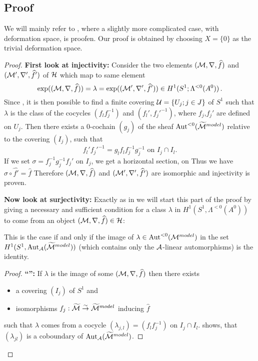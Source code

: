 \subsection{Proof}
We will mainly refer to \cite[section 6.d]{sabbah2007isomonodromic}, where a
slightly more complicated case, with deformation space, is proofen. Our proof is
obtained by choosing $X=\{0\}$ as the trivial deformation space.
\begin{comment}
  See also \cite{BJL1979Birkhoff} and \cite{babbitt1989local} although the proof
  goes back to work from Malgrange and Sibuya (see for example
  \cite{sibuya1990Linear}).
\end{comment}
\begin{proof}
  \textbf{First look at injectivity:}
  Consider the two elements $(\mathcal{M},\nabla,\widehat f)$ and $(\mathcal{M}',\nabla',\widehat f')$
  of $\mathcal{H}$ which map to same element
  \[
    \exp((\mathcal{M},\nabla,\widehat f))=\lambda=\exp((\mathcal{M}',\nabla',\widehat f'))
      \in H^1(S^1;\Lambda^{<0}(A^0)) \,.
  \]
  Since \TODO{}, it is then possible to find a finite covering
  $\mathcal{U}=\{U_j;j\in J\}$ of $S^1$ such that $\lambda$ is the class of the
  cocycles $(f_lf_j^{-1})$ and $(f_l',f_j'^{-1})$, where $f_j$,$f_j'$ are
  defined on $U_j$.
  Then there exists \TODO{} a $0$-cochain $(g_j)$ of the sheaf
  $\operatorname{Aut}^{<0}(\widetilde{\mathcal{M}}^{model})$ relative to the covering $(I_j)$, such that
  \[
    f_l'f_j'^{-1}=g_lf_lf_j^{-1}g_j^{-1} \text{ on } I_j\cap I_l.
  \]
  If we set $\sigma=f_j^{-1}g_{j}^{-1}f_j'$ on $I_{j}$, we get a horizontal
  section, on \TODO{}
  Thus we have $\sigma\circ\hat{f'}=\hat f$ Therefore $(\mathcal{M},\nabla,\widehat f)$ and
  $(\mathcal{M}',\nabla',\widehat{f'})$ are isomorphic and injectivity is proven.

  \textbf{Now look at surjectivity:}
  Exactly as in \cite{sabbah2007isomonodromic} we will start this part of the proof by giving a
  necessary and sufficient condition for a class $\lambda$ in
  $H^1(S^1,\Lambda^{<0}(A^0))$
  \TODO[$\Lambda^{<0}(A^0)\hat{=}\Aut^{<0}(\tilde\cM^{model})$ or
  $\Aut^{<0}(\cM^{model})$?]
  to come from an object
  $(\mathcal{M},\nabla,\widehat f)\in\mathcal{H}$:
  \begin{einr}
    This is the case if and only if the image of
    $\lambda\in\operatorname{Aut}^{<0}(\mathcal{M}^{model})$ in the set
    $H^1(S^1,\operatorname{Aut}_{\mathcal{A}}(\widetilde{\mathcal{M}}^{model}))$ (which contains only the
    $\mathcal{A}$-linear automorphisms) is the identity.
  \end{einr}
  \begin{proof}
    \textbf{``\Rightarrow{}'':}
    If $\lambda$ is the image of some $(\mathcal{M},\nabla,\widehat f)$ then there exists
    \begin{itemize}
      \item a covering $(I_{j})$ of $S^1$ and
      \item isomorphisms $f_j:\widetilde{\mathcal{M}}\overset{\sim}\to\widetilde{\mathcal{M}}^{model}$
        inducing $\hat f$
    \end{itemize}
    such that $\lambda$ comes from a cocycle $(\lambda_{j,l})=(f_lf_j^{-1})$ on
    $I_j\cap I_l$.
    \TODO{} shows, that $(\lambda_{jl})$ is a coboundary of
    $\operatorname{Aut}_\mathcal{A}(\widetilde{\mathcal{M}}^{model})$.


\end{proof}
\end{proof}
